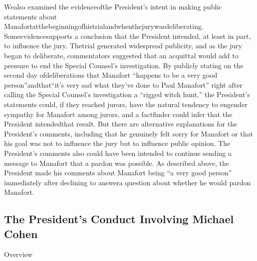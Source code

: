 Wealso examined the evidenceofthe President’s intent in making public statements about Manafortatthebeginningofhistrialandwhenthejurywasdeliberating. Someevidencesupports a conclusion that the President intended, at least in part, to influence the jury. Thetrial generated widespread publicity, and as the jury began to deliberate, commentators suggested that an acquittal would add to pressure to end the Special Counsel’s investigation. By publicly stating on the second day ofdeliberations that Manafort “happens to be a very good person”andthat“it’s very sad what they’ve done to Paul Manafort” right after calling the Special Counsel’s investigation a “rigged witch hunt,” the President’s statements could, if they reached jurors, have the natural tendency to engender sympathy for Manafort among jurors, and a factfinder could infer that the President intendedthat result. But there are alternative explanations for the President’s comments, including that he genuinely felt sorry for Manafort or that his goal was not to influence the jury but to influence public opinion. The President’s comments also could have been intended to continue sending a message to Manafort that a pardon was possible. As described above, the President made his comments about Manafort being “a very good person” immediately after declining to answera question about whether he would pardon Manafort.


\subsection{The President’s Conduct Involving Michael Cohen}

Overview

